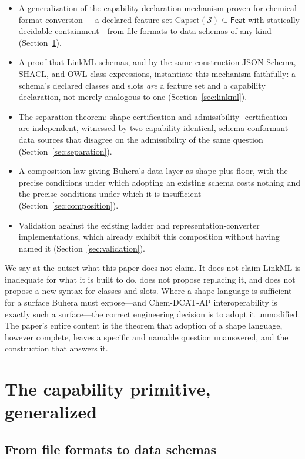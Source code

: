 \documentclass[11pt,a4paper,twocolumn]{article}
\theoremstyle{definition}
\theoremstyle{remark}
\newcommand{\Feat}{\mathsf{Feat}}
\newcommand{\Capset}{\mathrm{Capset}}
\newcommand{\Src}{\mathcal{S}}
\begin{document}
\begin{itemize}[leftmargin=1.4em]
  \item A generalization of the capability-declaration mechanism proven for
  chemical format conversion~\cite{masamune}---a declared feature set
  $\Capset(\Src)\subseteq\Feat$ with statically decidable containment---from file
  formats to data schemas of any kind (Section~\ref{sec:capability}).
  \item A proof that LinkML schemas, and by the same construction JSON Schema,
  SHACL, and OWL class expressions, instantiate this mechanism faithfully: a
  schema's declared classes and slots \emph{are} a feature set and a capability
  declaration, not merely analogous to one (Section~\ref{sec:linkml}).
  \item The separation theorem: shape-certification and admissibility-
  certification are independent, witnessed by two capability-identical,
  schema-conformant data sources that disagree on the admissibility of the same
  question (Section~\ref{sec:separation}).
  \item A composition law giving Buhera's data layer as shape-plus-floor, with
  the precise conditions under which adopting an existing schema costs nothing
  and the precise conditions under which it is insufficient
  (Section~\ref{sec:composition}).
  \item Validation against the existing ladder and representation-converter
  implementations, which already exhibit this composition without having
  named it (Section~\ref{sec:validation}).
\end{itemize}

We say at the outset what this paper does not claim. It does not claim LinkML is
inadequate for what it is built to do, does not propose replacing it, and does
not propose a new syntax for classes and slots. Where a shape language is
sufficient for a surface Buhera must expose---and Chem-DCAT-AP interoperability
is exactly such a surface---the correct engineering decision is to adopt it
unmodified. The paper's entire content is the theorem that adoption of a shape
language, however complete, leaves a specific and namable question
unanswered, and the construction that answers it.

\section{The capability primitive, generalized}
\label{sec:capability}

\subsection{From file formats to data schemas}
\end{document}
